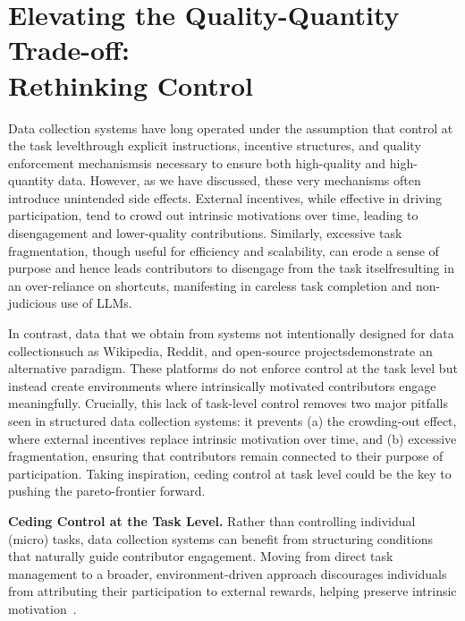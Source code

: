\section{Elevating the Quality-Quantity Trade-off: \\Rethinking Control}
Data collection systems have long operated under the assumption that control at the task level\textemdash{}through explicit instructions, incentive structures, and quality enforcement mechanisms\textemdash{}is necessary to ensure both high-quality and high-quantity data. However, as we have discussed, these very mechanisms often introduce unintended side effects. External incentives, while effective in driving participation, tend to crowd out intrinsic motivations over time, leading to disengagement and lower-quality contributions. Similarly, excessive task fragmentation, though useful for efficiency and scalability, can erode a sense of purpose and hence leads contributors to disengage from the task itself\textemdash{}resulting in an over-reliance on shortcuts, manifesting in careless task completion and non-judicious use of LLMs.

In contrast, data that we obtain from systems not intentionally designed for data collection\textemdash{}such as Wikipedia, Reddit, and open-source projects\textemdash{}demonstrate an alternative paradigm. These platforms do not enforce control at the task level but instead create environments where intrinsically motivated contributors engage meaningfully. Crucially, this lack of task-level control removes two major pitfalls seen in structured data collection systems: it prevents (a) the crowding-out effect, where external incentives replace intrinsic motivation over time, and (b) excessive fragmentation, ensuring that contributors remain connected to their purpose of participation. Taking inspiration, ceding control at task level could be the key to pushing the pareto-frontier forward.

\textbf{Ceding Control at the Task Level.} Rather than controlling individual (micro) tasks, data collection systems can benefit from structuring conditions that naturally guide contributor engagement. Moving from direct task management to a broader, environment-driven approach discourages individuals from attributing their participation to external rewards, helping preserve intrinsic motivation~\cite{bem1972self}. 

